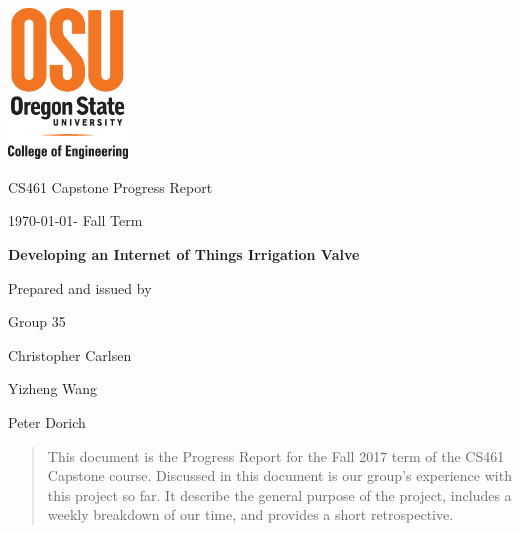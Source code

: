 \documentclass[onecolumn, draftclsnofoot,10pt, compsoc]{IEEEtran}
\def \CapstoneTeamName{     Group}
\def \CapstoneTeamNumber{       35}
\def \GroupMemberOne{           Christopher Carlsen}
\def \GroupMemberTwo{           Yizheng Wang}
\def \GroupMemberThree{         Peter Dorich}
\def \CapstoneProjectName{      Developing an Internet of Things Irrigation Valve}
\def \CapstoneSponsorCompany{       OSU \textbar\hspace{.05in} Openly Published Environmental Sensing (OPEnS) Lab}
\def \CapstoneSponsorPerson{        Chet Udell}
\def \DocType{      %
    Progress Report
}
\newcommand{\NameSigPair}[1]{\par
    \makebox[2.75in][r]{#1} \hfil   \makebox[3.25in]{\makebox[2.25in]{\hrulefill} \hfill        \makebox[.75in]{\hrulefill}}
    \par\vspace{-12pt} \textit{\tiny\noindent
        \makebox[2.75in]{} \hfil        \makebox[3.25in]{\makebox[2.25in][r]{Signature} \hfill  \makebox[.75in][r]{Date}}}}
\renewcommand{\NameSigPair}[1]{#1}
\begin{document}
    \begin{titlepage}
        \begin{singlespace}
            \includegraphics[height=4cm]{coe_v_spot1}
            \hfill 
            \par\vspace{.2in}
            \centering
            \scshape{
                \huge CS461 Capstone \DocType \par
                {\large\today - Fall Term}\par
                \vspace{.5in}
                \textbf{\Huge\CapstoneProjectName}\par
                \vfill
                {\large Prepared and issued by }\par
                Group\CapstoneTeamNumber\par
                \vspace{5pt}
                {\Large
                    \NameSigPair{\GroupMemberOne}\par
                    \NameSigPair{\GroupMemberTwo}\par
                    \NameSigPair{\GroupMemberThree}\par
                }
                \vspace{20pt}
            }
            \begin{abstract}
                This document is the Progress Report for the Fall 2017 term of the CS461 Capstone course. Discussed in this document is our group's experience with this project so far. It describe the general purpose of the project, includes a weekly breakdown of our time, and provides a short retrospective.
            \end{abstract}     
        \end{singlespace}
    \end{titlepage}
    \newpage
    \tableofcontents
    \clearpage
    
\end{document}
